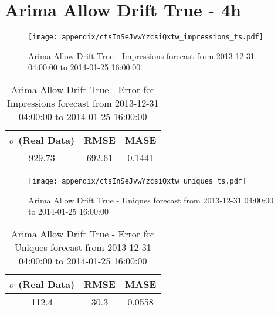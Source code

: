 \section{Arima Allow Drift True - 4h}
\begin{figure}[H] \begin{center} \leavevmode
\texttt{[image: appendix/ctsInSeJvwYzcsiQxtw\_impressions\_ts.pdf]} \caption[]{
Arima Allow Drift True - Impressions forecast from 2013-12-31 04:00:00 to 2014-01-25 16:00:00} \label{fig:appendix/ctsInSeJvwYzcsiQxtw_impressions_ts.pdf} \end{center}
\end{figure}

\begin{table}[H]
\centering
\footnotesize
\begin{tabular}{ccc}
$\sigma$ (Real Data) & RMSE & MASE   \\ \hline
929.73 & 692.61 & 0.1441 \\
\end{tabular}

\vspace{0.5cm}

\caption[]{
Arima Allow Drift True - Error for Impressions forecast from 2013-12-31 04:00:00 to 2014-01-25 16:00:00}
\end{table}

\begin{figure}[H] \begin{center} \leavevmode
\texttt{[image: appendix/ctsInSeJvwYzcsiQxtw\_uniques\_ts.pdf]} \caption[]{
Arima Allow Drift True - Uniques forecast from 2013-12-31 04:00:00 to 2014-01-25 16:00:00} \label{fig:appendix/ctsInSeJvwYzcsiQxtw_uniques_ts.pdf} \end{center}
\end{figure}

\begin{table}[H]
\centering
\footnotesize
\begin{tabular}{ccc}
$\sigma$ (Real Data) & RMSE & MASE   \\ \hline
112.4 & 30.3 & 0.0558 \\
\end{tabular}

\vspace{0.5cm}

\caption[]{
Arima Allow Drift True - Error for Uniques forecast from 2013-12-31 04:00:00 to 2014-01-25 16:00:00}
\end{table}

